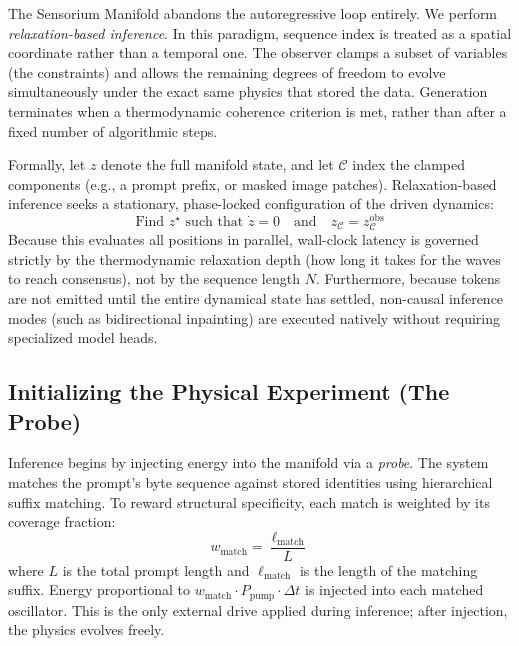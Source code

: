 \documentclass[11pt,a4paper]{article}
\begin{document}
The Sensorium Manifold abandons the autoregressive loop entirely. We perform \emph{relaxation-based inference}. In this paradigm, sequence index is treated as a spatial coordinate rather than a temporal one. The observer clamps a subset of variables (the constraints) and allows the remaining degrees of freedom to evolve simultaneously under the exact same physics that stored the data. Generation terminates when a thermodynamic coherence criterion is met, rather than after a fixed number of algorithmic steps. 

Formally, let $z$ denote the full manifold state, and let $\mathcal{C}$ index the clamped components (e.g., a prompt prefix, or masked image patches). Relaxation-based inference seeks a stationary, phase-locked configuration of the driven dynamics:
\begin{equation}
\text{Find } z^\star \text{ such that } \dot{z} = 0
\quad\text{and}\quad
z_{\mathcal{C}} = z^{\mathrm{obs}}_{\mathcal{C}}
\end{equation}
Because this evaluates all positions in parallel, wall-clock latency is governed strictly by the thermodynamic relaxation depth (how long it takes for the waves to reach consensus), not by the sequence length $N$. Furthermore, because tokens are not emitted until the entire dynamical state has settled, non-causal inference modes (such as bidirectional inpainting) are executed natively without requiring specialized model heads.

\subsection{Initializing the Physical Experiment (The Probe)}
\label{subsec:probe}

Inference begins by injecting energy into the manifold via a \emph{probe}. The system matches the prompt's byte sequence against stored identities using hierarchical suffix matching. To reward structural specificity, each match is weighted by its coverage fraction:
\begin{equation}
w_{\text{match}} = \frac{\ell_{\text{match}}}{L}
\label{eq:probe_weight}
\end{equation}
where $L$ is the total prompt length and $\ell_{\text{match}}$ is the length of the matching suffix. Energy proportional to $w_{\text{match}} \cdot P_{\text{pump}} \cdot \Delta t$ is injected into each matched oscillator. This is the only external drive applied during inference; after injection, the physics evolves freely.
\end{document}
